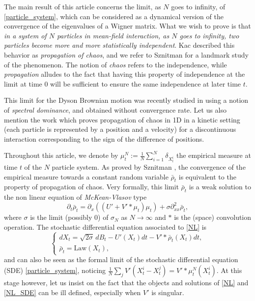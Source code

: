 The main result of this article concerns the limit, as $N$ goes to infinity, of \eqref{particle_system}, which can be considered as a dynamical version of the convergence of the eigenvalues of a Wigner matrix. What we wish to prove is that \textit{in a system of $N$ particles in mean-field interaction, as $N$ goes to infinity, two particles become more and more statistically independent}. Kac \cite{kac1956} described this behavior as \textit{propagation of chaos}, and we refer to Sznitman \cite{Saint_Flour_1991} for a landmark study of the phenomenon. The notion of \textit{chaos} refers to the independence, while \textit{propagation} alludes to the fact that having this property of independence at the limit at time $0$ will be sufficient to ensure the same independence at later time $t$.

This limit for the Dyson Brownian motion was recently studied in \cite{BDLL21} using a notion of \textit{spectral dominance}, and obtained without convergence rate. Let us also mention the work \cite{HS19} which proves propagation of chaos in 1D in a kinetic setting (\ie each particle is represented by a position and a velocity) for a discontinuous interaction corresponding to the sign of the difference of positions.

Throughout this article, we denote by $\mu^N_t:=\frac{1}{N}\sum_{i=1}^N\delta_{X^i_t}$ the empirical measure at time $t$ of the $N$ particle system. As proved by Sznitman \cite{Saint_Flour_1991}, the convergence of the empirical measure towards a constant random variable $\bar{\rho}_t$ is equivalent to the property of propagation of chaos. Very formally, this limit $\bar{\rho}_t$ is a weak solution to the non linear equation of \textit{McKean-Vlasov} type
\begin{equation}\label{NL}
\partial_t \bar{\rho}_t=\partial_x\left(\left(U'+V'\ast\mu_t\right)\mu_t\right)+\sigma \partial^2_{xx}\bar{\rho}_t,
\end{equation}
where $\sigma$ is the limit (possibly $0$) of $\sigma_N$ as $N\to\infty$ and $\ast$ is the (space) convolution operation. The stochastic differential equation associated to \eqref{NL} is
\begin{equation}\label{NL_SDE}
\begin{cases}
dX_t=\sqrt{2\sigma}\,dB_t-U'(X_t)dt-V'\ast\bar{\rho}_t(X_t)dt,\\
\bar{\rho}_t=\text{Law}(X_t),
\end{cases}
\end{equation}
and can also be seen as the formal limit of the stochastic differential equation (SDE) \eqref{particle_system}, noticing $\frac{1}{N}\sum_{j}V'(X^i_t-X^j_t)=V'\ast\mu^N_t(X^i_t).$ At this stage however, let us insist on the fact that the objects and solutions of \eqref{NL} and \eqref{NL_SDE} can be ill defined, especially when $V'$ is singular.

